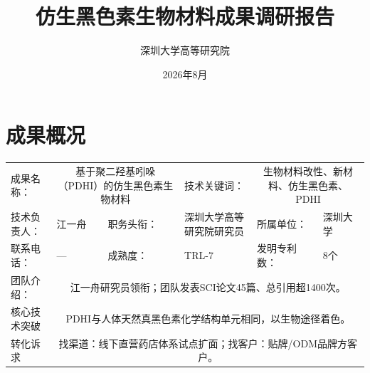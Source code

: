 \documentclass[nomath]{harryopo-paper}
\title{仿生黑色素生物材料成果调研报告}
\author{深圳大学高等研究院}
\date{2026年8月}
\begin{document}
\maketitle

\section*{成果概况}

\small
\begin{longtable}{|p{}|p{}|p{}|p{}|p{}|p{}|}
\hline
\endfirsthead
\hline
\endhead
\hline
\endfoot
\hline
\endlastfoot
\multicolumn{6}{|c|}{\fzht{成果基本信息}} \\ \hline
成果名称： & \multicolumn{2}{|c|}{基于聚二羟基吲哚（PDHI）的仿生黑色素生物材料} & 技术关键词： & \multicolumn{2}{|c|}{生物材料改性、新材料、仿生黑色素、PDHI} \\ \hline
技术负责人： & 江一舟 & 职务头衔： & 深圳大学高等研究院研究员 & 所属单位： & 深圳大学 \\ \hline
联系电话： & --- & 成熟度： & TRL-7 & 发明专利数： & 8个 \\ \hline
团队介绍： & \multicolumn{5}{|c|}{江一舟研究员领衔；团队发表SCI论文45篇、总引用超1400次。} \\ \hline
核心技术突破 & \multicolumn{5}{|c|}{PDHI与人体天然真黑色素化学结构单元相同，以生物途径着色。} \\ \hline
转化诉求 & \multicolumn{5}{|c|}{找渠道：线下直营药店体系试点扩面；找客户：贴牌/ODM品牌方客户。} \\ \hline
\end{longtable}
\end{document}
